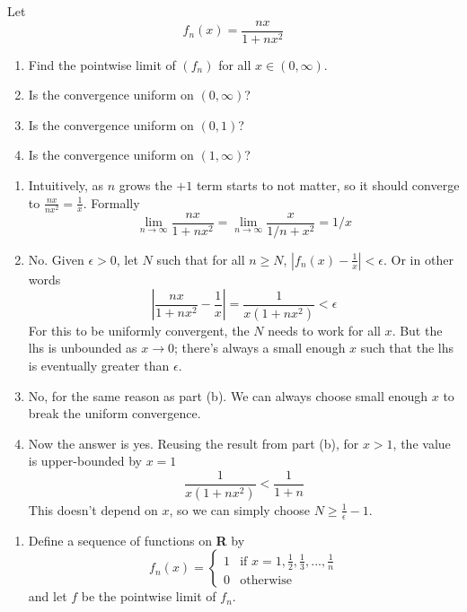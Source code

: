 \documentclass{oxmathproblems}
\begin{document}
\begin{questions}

\miquestion Let
\[f_{n}(x)=\frac{nx}{1+nx^2}\]
\begin{enumerate}[label=(\alph*)]
  \item Find the pointwise limit of $(f_{n})$ for all $x \in (0, \infty)$.
  \item Is the convergence uniform on $(0, \infty)$?
  \item Is the convergence uniform on $(0, 1)$?
  \item Is the convergence uniform on $(1, \infty)$?
\end{enumerate}

\begin{solution}
  \begin{enumerate}[label=(\alph*)]
    \item Intuitively, as $n$ grows the $+ 1$ term starts to not matter, so it should converge to $\frac{nx}{nx^2}=\frac{1}{x}$. Formally
    \[\lim_{n \to \infty}\frac{nx}{1+nx^2}=\lim_{n \to \infty}\frac{x}{1/n + x^2}=1/x\]
    \item No. Given $\epsilon > 0$, let $N$ such that for all $n \geq N$, $|f_{n}(x)-\frac{1}{x}| < \epsilon$. Or in other words
    \[\left|\frac{nx}{1+nx^2}-\frac{1}{x}\right| = \frac{1}{x(1+nx^2)} < \epsilon\]
    For this to be uniformly convergent, the $N$ needs to work for all $x$. But the lhs is unbounded as $x \to 0$; there's always a small enough $x$
    such that the lhs is eventually greater than $\epsilon$.
    \item No, for the same reason as part (b). We can always choose small enough $x$ to break the uniform convergence.
    \item Now the answer is yes. Reusing the result from part (b), for $x > 1$, the value is upper-bounded by $x=1$
    \[\frac{1}{x(1+nx^2)} < \frac{1}{1+n}\]
    This doesn't depend on $x$, so we can simply choose $N \geq \frac{1}{\epsilon}-1$.
  \end{enumerate}
\end{solution}

\miquestion
\begin{enumerate}[label=(\alph*)]
  \item Define a sequence of functions on \textbf{R} by
  \[
    f_{n}(x) = \begin{cases}
      1 & \text{if } x = 1, \frac{1}{2}, \frac{1}{3}, ..., \frac{1}{n}\\
      0 & \text{otherwise}
    \end{cases}
  \]
  and let $f$ be the pointwise limit of $f_{n}$.


\end{enumerate}
\end{questions}
\end{document}
